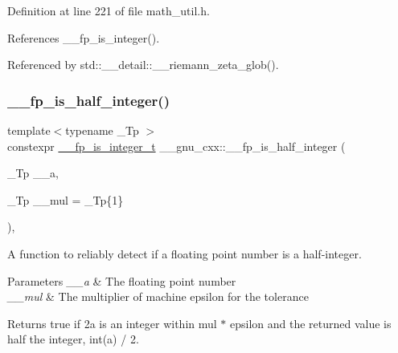 Definition at line 221 of file math\+\_\+util.\+h.



References \+\_\+\+\_\+fp\+\_\+is\+\_\+integer().



Referenced by std\+::\+\_\+\+\_\+detail\+::\+\_\+\+\_\+riemann\+\_\+zeta\+\_\+glob().

\mbox{\label{namespace____gnu__cxx_a1f53ff9c9325c6bd9f4ababf5f7e62e4}} 
\subsubsection{\texorpdfstring{\+\_\+\+\_\+fp\+\_\+is\+\_\+half\+\_\+integer()}{\_\_fp\_is\_half\_integer()}}
{\footnotesize\ttfamily template$<$typename \+\_\+\+Tp $>$ \\
constexpr \hyperlink{struct____gnu__cxx_1_1____fp__is__integer__t}{\+\_\+\+\_\+fp\+\_\+is\+\_\+integer\+\_\+t} \+\_\+\+\_\+gnu\+\_\+cxx\+::\+\_\+\+\_\+fp\+\_\+is\+\_\+half\+\_\+integer (\begin{DoxyParamCaption}\item[{\+\_\+\+Tp}]{\+\_\+\+\_\+a,  }\item[{\+\_\+\+Tp}]{\+\_\+\+\_\+mul = {\ttfamily \+\_\+Tp\{1\}} }\end{DoxyParamCaption})\hspace{0.3cm}{\ttfamily [inline]}, {\ttfamily [noexcept]}}

A function to reliably detect if a floating point number is a half-\/integer.


\begin{DoxyParams}{Parameters}
{\em \+\_\+\+\_\+a} & The floating point number \\
\hline
{\em \+\_\+\+\_\+mul} & The multiplier of machine epsilon for the tolerance \\
\hline
\end{DoxyParams}
\begin{DoxyReturn}{Returns}
{\ttfamily true} if 2a is an integer within mul $\ast$ epsilon and the returned value is half the integer, int(a) / 2. 
\end{DoxyReturn}


